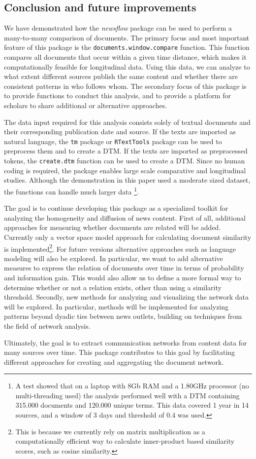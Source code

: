 \documentclass[]{article}
\let\rmarkdownfootnote\footnote%
\def\footnote{\protect\rmarkdownfootnote}
\begin{document}
\subsection{Conclusion and future
improvements}\label{conclusion-and-future-improvements}

We have demonstrated how the \emph{newsflow} package can be used to
perform a many-to-many comparison of documents. The primary focus and
most important feature of this package is the
\texttt{documents.window.compare} function. This function compares all
documents that occur within a given time distance, which makes it
computationally feasible for longitudinal data. Using this data, we can
analyze to what extent different sources publish the same content and
whether there are consistent patterns in who follows whom. The secondary
focus of this package is to provide functions to conduct this analysis,
and to provide a platform for scholars to share additional or
alternative approaches.

The data input required for this analysis consists solely of textual
documents and their corresponding publication date and source. If the
texts are imported as natural language, the \texttt{tm} package or
\texttt{RTextTools} package can be used to preprocess them and to create
a DTM. If the texts are imported as preprocessed tokens, the
\texttt{create.dtm} function can be used to create a DTM. Since no human
coding is required, the package enables large scale comparative and
longitudinal studies. Although the demonstration in this paper used a
moderate sized dataset, the functions can handle much larger data
\footnote{A test showed that on a laptop with 8Gb RAM and a 1.80GHz
  processor (no multi-threading used) the analysis performed well with a
  DTM containing 315.000 documents and 120.000 unique terms. This data
  covered 1 year in 14 sources, and a window of 3 days and threshold of
  0.4 was used.}.

The goal is to continue developing this package as a specialized toolkit
for analyzing the homogeneity and diffusion of news content. First of
all, additional approaches for measuring whether documents are related
will be added. Currently only a vector space model approach for
calculating document similarity is implemented\footnote{This is because
  we currently rely on matrix multiplication as a computationally
  efficient way to calculate inner-product based similarity scores, such
  as cosine similarity.}. For future versions alternative approaches
such as language modeling will also be explored. In particular, we want
to add alternative measures to express the relation of documents over
time in terms of probability and information gain. This would also allow
us to define a more formal way to determine whether or not a relation
exists, other than using a similarity threshold. Secondly, new methods
for analyzing and visualizing the network data will be explored. In
particular, methods will be implemented for analyzing patterns beyond
dyadic ties between news outlets, building on techniques from the field
of network analysis.

Ultimately, the goal is to extract communication networks from content
data for many sources over time. This package contributes to this goal
by facilitating different approaches for creating and aggregating the
document network.

\renewcommand\refname{References}

\end{document}
